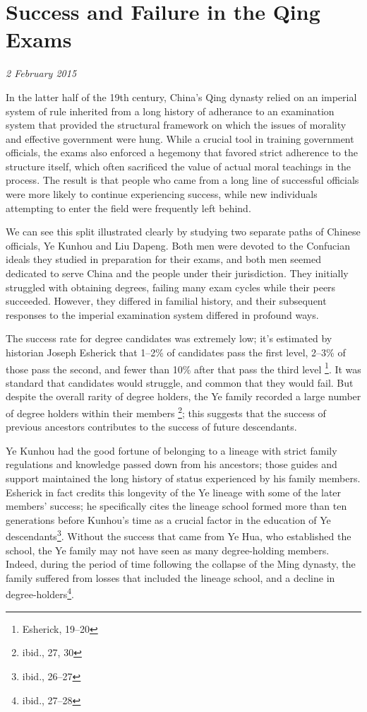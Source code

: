 \section{Success and Failure in the Qing Exams}

\textit{2 February 2015}

In the latter half of the 19th century, China's Qing dynasty relied on an
imperial system of rule inherited from a long history of adherance to an
examination system that provided the structural framework on which the issues of
morality and effective government were hung. While a crucial tool in training
government officials, the exams also enforced a hegemony that favored strict
adherence to the structure itself, which often sacrificed the value of actual
moral teachings in the process. The result is that people who came from a long
line of successful officials were more likely to continue experiencing success,
while new individuals attempting to enter the field were frequently left behind.

We can see this split illustrated clearly by studying two separate paths of
Chinese officials, Ye Kunhou and Liu Dapeng. Both men were devoted to the
Confucian ideals they studied in preparation for their exams, and both men
seemed dedicated to serve China and the people under their jurisdiction. They
initially struggled with obtaining degrees, failing many exam cycles while their
peers succeeded. However, they differed in familial history, and their
subsequent responses to the imperial examination system differed in profound
ways.

The success rate for degree candidates was extremely low; it's estimated by
historian Joseph Esherick that 1--2\% of candidates pass the first level, 2--3\%
of those pass the second, and fewer than 10\% after that pass the third level
\footnote{Esherick, 19--20}. It was standard that candidates would struggle, and
common that they would fail. But despite the overall rarity of degree holders,
the Ye family recorded a large number of degree holders within their members
\footnote{ibid., 27, 30}; this suggests that the success of previous ancestors
contributes to the success of future descendants.

Ye Kunhou had the good fortune of belonging to a lineage with strict family
regulations and knowledge passed down from his ancestors; those guides and
support maintained the long history of status experienced by his family members.
Esherick in fact credits this longevity of the Ye lineage with some of the later
members' success; he specifically cites the lineage school formed more than ten
generations before Kunhou's time as a crucial factor in the education of Ye
descendants\footnote{ibid., 26--27}. Without the success that came from Ye Hua,
who established the school, the Ye family may not have seen as many
degree-holding members. Indeed, during the period of time following the collapse
of the Ming dynasty, the family suffered from losses that included the lineage
school, and a decline in degree-holders\footnote{ibid., 27--28}.

